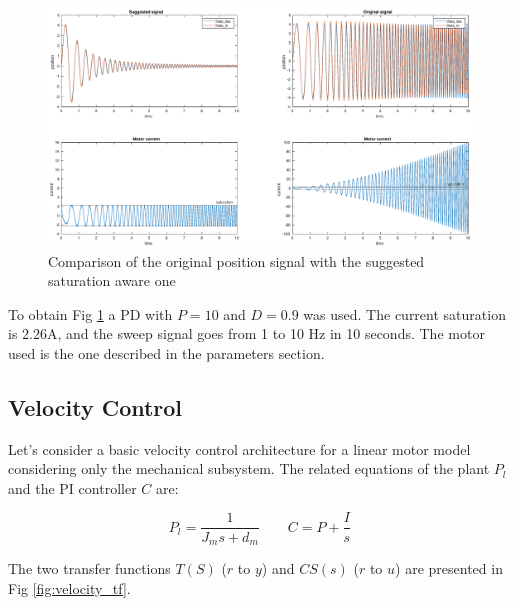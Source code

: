 \documentclass[a4paper,11pt]{article}
\begin{document}
\begin{figure}[H]
\begin{center}
\hspace*{-5cm}
\includegraphics[width=1.6\textwidth]{images/position_tau2.eps}
\end{center}
\caption{Comparison of the original position signal with the suggested saturation aware one}
\label{fig:position_tau}
\end{figure}

To obtain Fig \ref{fig:position_tau} a PD with $P = 10$ and $D = 0.9$ was used. The current saturation is $2.26$A, and the sweep signal goes from 1 to 10 Hz in 10 seconds. The motor used is the one described in the parameters section.

\newpage
\subsection{Velocity Control}
Let's consider a basic velocity control architecture for a linear motor model considering only the mechanical subsystem. The related equations of the plant $P_l$ and the PI controller $C$ are:

\[
P_l = \frac{1}{J_m s + d_m} \qquad
C = P + \frac{I}{s}
\]

\bigskip
\noindent The two transfer functions $T(S)$ ($r$ to $y$) and $CS(s)$ ($r$ to $u$) are presented in Fig \ref{fig:velocity_tf}.
\end{document}

